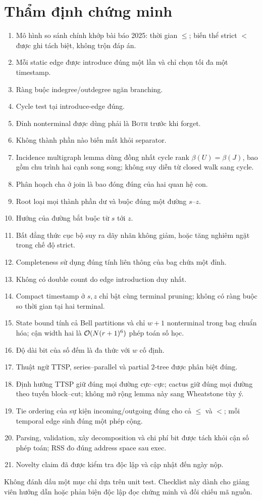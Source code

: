 \chapter{Thẩm định chứng minh}

\begin{enumerate}[label=$\square$,leftmargin=1.2cm]
  \item Mô hình so sánh chính khớp bài báo 2025: thời gian $\le$; biến thể strict $<$ được ghi tách biệt, không trộn đáp án.
  \item Mỗi static edge được introduce đúng một lần và chỉ chọn tối đa một timestamp.
  \item Ràng buộc indegree/outdegree ngăn branching.
  \item Cycle test tại introduce-edge đúng.
  \item Đỉnh nonterminal được dùng phải là \textsc{Both} trước khi forget.
  \item Không thành phần nào biến mất khỏi separator.
  \item Incidence multigraph lemma dùng đồng nhất cycle rank $\beta(U)=\beta(J)$, bao gồm chu trình hai cạnh song song; không suy diễn từ closed walk sang cycle.
  \item Phân hoạch cha ở join là bao đóng đúng của hai quan hệ con.
  \item Root loại mọi thành phần dư và buộc đúng một đường $s$--$z$.
  \item Hướng của đường bắt buộc từ $s$ tới $z$.
  \item Bất đẳng thức cục bộ suy ra dãy nhãn không giảm, hoặc tăng nghiêm ngặt trong chế độ strict.
  \item Completeness sử dụng đúng tính liên thông của bag chứa một đỉnh.
  \item Không có double count do edge introduction duy nhất.
  \item Compact timestamp ở $s,z$ chỉ bật cùng terminal pruning; không có ràng buộc so thời gian tại hai terminal.
  \item State bound tính cả Bell partitions và chỉ $w+1$ nonterminal trong bag chuẩn hóa; cận width hai là $\mathcal{O}(N(r+1)^6)$ phép toán số học.
  \item Độ dài bit của số đếm là đa thức với $w$ cố định.
  \item Thuật ngữ TTSP, series--parallel và partial $2$-tree được phân biệt đúng.
  \item Định hướng TTSP giữ đúng mọi đường cực--cực; cactus giữ đúng mọi đường theo tuyến block--cut; không mở rộng lemma này sang Wheatstone tùy ý.
  \item Tie ordering của sự kiện incoming/outgoing đúng cho cả $\le$ và $<$; mỗi temporal edge sinh đúng một phép cộng.
  \item Parsing, validation, xây decomposition và chi phí bit được tách khỏi cận số phép toán; RSS đo đúng address space sau exec.
  \item Novelty claim đã được kiểm tra độc lập và cập nhật đến ngày nộp.
\end{enumerate}

Không đánh dấu một mục chỉ dựa trên unit test. Checklist này dành cho giảng viên hướng dẫn hoặc phản biện độc lập đọc chứng minh và đối chiếu mã nguồn.

